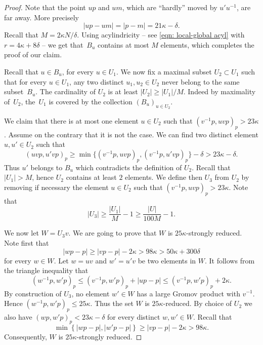 \documentclass[JEP,XML,SOM,Unicode, NoEqCountersInSection,published]{cedram}
\theoremstyle{plain}
\theoremstyle{definition}
\begin{document}
\begin{proof}
Note that the point $up$ and $um$, which are ``hardly'' moved by $u'u^{-1}$, are far away.
More precisely
\begin{equation*}
|up- um| = |p - m|= 21\kappa - \delta.
\end{equation*}
Recall that $M = 2\kappa N /\delta$.
Using acylindricity -- see \eqref{eqn: local-global acyl} with $r = 4\kappa + 8\delta$ -- we get that~$B_u$ contains at most $M$ elements, which completes the proof of our claim.

Recall that $u \in B_u$, for every $u \in U_1$.
We now fix a maximal subset $U_2 \subset U_1$ such that for every $u \in U_1$, any two distinct $u_1, u_2 \in U_2$ never belong to the same subset~$B_u$.
The cardinality of $U_2$ is at least $|U_2| \geq |U_1|/M$.
Indeed by maximality of~$U_2$, the~$U_1$ is covered by the collection $(B_u)_{u \in U_2}$.

We claim that there is at most one element $u \in U_2$ such that $(v^{-1}p, uvp)_p > 23\kappa$.
Assume on the contrary that it is not the case.
We can find two distinct element $u,u' \in U_2$ such that
\begin{equation*}
(uvp,u'vp)_p \geq \min\{ (v^{-1}p, uvp)_p, (v^{-1}p, u'vp)_p\} - \delta > 23\kappa - \delta.
\end{equation*}
Thus $u'$ belongs to $B_u$ which contradicts the definition of $U_2$.
Recall that $|U_1| > M$, hence $U_2$ contains at least $2$ elements.
We define then $U_3$ from $U_2$ by removing if necessary the element $u \in U_2$ such that $(v^{-1}p, uvp)_p > 23\kappa$.
Note that
\begin{equation*}
|U_3| \geq \frac{|U_1|}M - 1 \geq \frac{|U|}{100M} - 1.
\end{equation*}

We now let $W = U_3v$.
We are going to prove that $W$ is $25\kappa$-strongly reduced.
Note first that
\begin{equation*}
|wp - p| \geq |vp - p| - 2\kappa > 98 \kappa > 50\kappa + 300\delta
\end{equation*}
for every $w \in W$.
Let $w = uv$ and $w' = u'v$ be two elements in $W$.
It follows from the triangle inequality that
\begin{equation*}
(w^{-1}p, w'p) _p \leq (v^{-1}p, w'p)_p + |up - p| \leq (v^{-1}p, w'p)_p + 2\kappa.
\end{equation*}
By construction of $U_3$, no element $w' \in W$ has a large Gromov product with $v^{-1}$.
Hence $(w^{-1}p, w'p) _p \leq 25\kappa$.
Thus the set $W$ is $25\kappa$-reduced.
By choice of $U_2$ we also have $(wp,w'p)_p < 23\kappa - \delta$ for every distinct $w,w' \in W$.
Recall that
\begin{equation*}
\min\left\{ |wp-p|, |w'p-p| \right\} \geq |vp - p| - 2\kappa > 98\kappa.
\end{equation*}
Consequently, $W$ is $25\kappa$-strongly reduced.
\end{proof}
\end{document}
